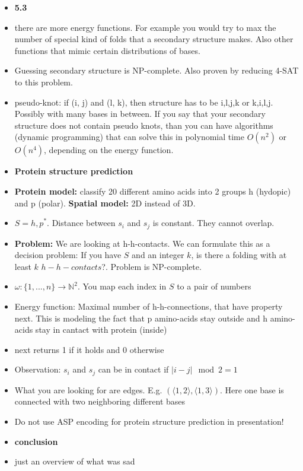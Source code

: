 \documentclass[runningheads]{llncs}
\begin{document}
\begin{itemize}
    
    
    \item \textbf{5.3}
    \item there are more energy functions. For example you would try to max the number of special kind of folds that a secondary structure makes. Also other functions that mimic certain distributions of bases.
    \item Guessing secondary structure is NP-complete. Also proven by reducing 4-SAT to this problem. 
    \item pseudo-knot: if (i, j) and (l, k), then structure has to be i,l,j,k or k,i,l,j. Possibly with many bases in between. If you say that your secondary structure does not contain pseudo knots, than you can have algorithms (dynamic programming) that can solve this in polynomial time $O(n^2)$ or $O(n^4)$, depending on the energy function. 
    
    
    \item \textbf{Protein structure prediction}
    \item \textbf{Protein model:} classify 20 different amino acids into 2 groups h (hydopic) and p (polar). \textbf{Spatial model:} 2D instead of 3D. 
    \item $S = {h,p}^*$. Distance between $s_i$ and $s_j$ is constant. They cannot overlap. 
    \item \textbf{Problem:} We are looking at h-h-contacts. We can formulate this as a decision problem: If you have $S$ and an integer $k$, is there a folding with at least $k$ $h-h-contacts$?. Problem is NP-complete. 
    \item $\omega : \{1,...,n\} \longrightarrow \mathbb{N}^2$. You map each index in $S$ to a pair of numbers
    \item Energy function: Maximal number of h-h-connections, that have property next. This is modeling the fact that p amino-acids stay outside and h amino-acids stay in cantact with protein (inside) 
    \item next returns 1 if it holds and 0 otherwise
    \item Observation: $s_i$ and $s_j$ can be in contact if $|i - j| \mod 2 = 1$
    \item What you are looking for are edges. E.g. $(\langle 1, 2 \rangle, \langle 1,3 \rangle )$. Here one base is connected with two neighboring different bases
    \item Do not use ASP encoding for protein structure prediction in presentation!
    
    \item \textbf{conclusion} 
    \item just an overview of what was sad
    
\end{itemize}
\end{document}
